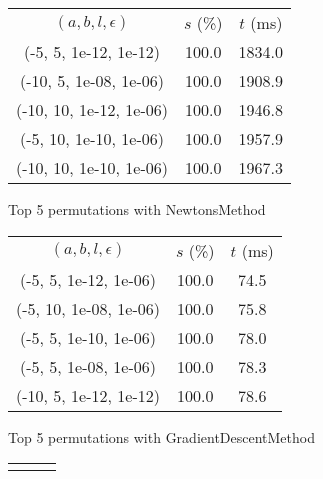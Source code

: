 \begin{figure}[H]
\label{fig:param_comp_NegativeEntropy_FibonacciSearch}
\begin{subfigure}[ht]{.5\textwidth}
\begin{tabular}{|c|c|c|}
\hline
\rowcolor{gray!25}
\multicolumn{3}{|c|}{NewtonsMethod} \\
\hline
\rowcolor{gray!25}
$(a,b,l,\epsilon)$ & $s$ (\%) & $t$ (ms) \\
\hline
(-5, 5, 1e-12, 1e-12) & 100.0 & 1834.0 \\
(-10, 5, 1e-08, 1e-06) & 100.0 & 1908.9 \\
(-10, 10, 1e-12, 1e-06) & 100.0 & 1946.8 \\
(-5, 10, 1e-10, 1e-06) & 100.0 & 1957.9 \\
(-10, 10, 1e-10, 1e-06) & 100.0 & 1967.3 \\
\hline
\end{tabular}
\caption{Top 5 permutations with NewtonsMethod}
\label{subfig:param_comp_NegativeEntropy_NewtonsMethod_FibonacciSearch}
\end{subfigure}
\hfill
\begin{subfigure}[ht]{.5\textwidth}
\begin{tabular}{|c|c|c|}
\hline
\rowcolor{gray!25}
\multicolumn{3}{|c|}{GradientDescentMethod} \\
\hline
\rowcolor{gray!25}
$(a,b,l,\epsilon)$ & $s$ (\%) & $t$ (ms) \\
\hline
(-5, 5, 1e-12, 1e-06) & 100.0 & 74.5 \\
(-5, 10, 1e-08, 1e-06) & 100.0 & 75.8 \\
(-5, 5, 1e-10, 1e-06) & 100.0 & 78.0 \\
(-5, 5, 1e-08, 1e-06) & 100.0 & 78.3 \\
(-10, 5, 1e-12, 1e-12) & 100.0 & 78.6 \\
\hline
\end{tabular}
\caption{Top 5 permutations with GradientDescentMethod}
\label{subfig:param_comp_NegativeEntropy_GradientDescentMethod_FibonacciSearch}
\end{subfigure}
\hfill
\begin{subfigure}[ht]{.5\textwidth}
\begin{tabular}{|c|c|c|}
\hline
\rowcolor{gray!25}
\multicolumn{3}{|c|}{ConjugateGradientMethod} \\

\end{tabular}
\end{subfigure}
\end{figure}
